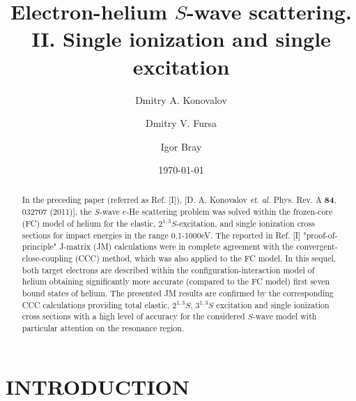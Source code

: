 \documentclass[aip
, pra
, showpacs
, aps
, twocolumn
, groupedaddress
, floatfix
]{revtex4}
\begin{document}
\title {Electron-helium $S$-wave scattering. II. Single ionization and single excitation}

\author{Dmitry A. Konovalov}

\author{Dmitry V. Fursa}

\author{Igor Bray}



\date{\today}

\begin{abstract}

In the preceding paper (referred as Ref. [I]), [D. A. Konovalov {\em et. al.} Phys. Rev. A {\bf 84}, 032707 (2011)],
the $S$-wave $e$-He scattering problem was solved within the frozen-core (FC) model of helium for
the elastic, $2^{1,3}S$-excitation, and single ionization cross sections for impact energies in the range 0.1-1000eV.
The reported in Ref. [I] "proof-of-principle" J-matrix (JM) calculations were in complete agreement with the convergent-close-coupling (CCC) method,
which was also applied to the FC model.
In this sequel, 
both target electrons are described within the configuration-interaction model of helium obtaining significantly more accurate (compared to the FC model)
first seven bound states of helium.
The presented JM results are confirmed by the corresponding CCC calculations providing
total elastic, $2^{1,3}S$, $3^{1,3}S$ excitation and single ionization cross sections with a high level of accuracy for the considered $S$-wave model
with particular attention on the resonance region.

\end{abstract}

\maketitle



\section{INTRODUCTION}
\end{document}
